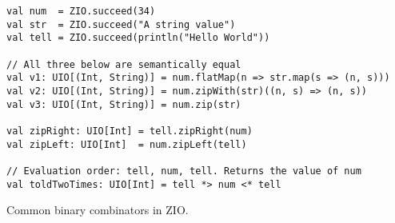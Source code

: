 \begin{algorithm}

\begin{verbatim}
val num  = ZIO.succeed(34)
val str  = ZIO.succeed("A string value")
val tell = ZIO.succeed(println("Hello World"))

// All three below are semantically equal
val v1: UIO[(Int, String)] = num.flatMap(n => str.map(s => (n, s)))
val v2: UIO[(Int, String)] = num.zipWith(str)((n, s) => (n, s))
val v3: UIO[(Int, String)] = num.zip(str)

val zipRight: UIO[Int] = tell.zipRight(num)
val zipLeft: UIO[Int]  = num.zipLeft(tell)

// Evaluation order: tell, num, tell. Returns the value of num
val toldTwoTimes: UIO[Int] = tell *> num <* tell
\end{verbatim}

\caption{Common binary combinators in ZIO. \label{zio:binary-combinators}}
\end{algorithm}